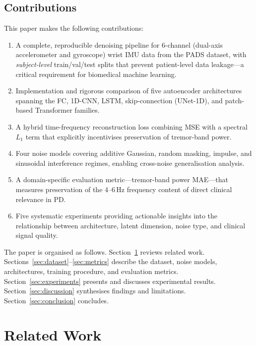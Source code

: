 \documentclass{article}
\begin{document}
\subsection{Contributions}

This paper makes the following contributions:

\begin{enumerate}
  \item A complete, reproducible denoising pipeline for 6-channel (dual-axis
    accelerometer and gyroscope) wrist IMU data from the PADS dataset, with
    \emph{subject-level} train/val/test splits that prevent patient-level
    data leakage---a critical requirement for biomedical machine learning.
  \item Implementation and rigorous comparison of five autoencoder architectures
    spanning the FC, 1D-CNN, LSTM, skip-connection (UNet-1D), and
    patch-based Transformer families.
  \item A hybrid time-frequency reconstruction loss combining MSE with a
    spectral $L_1$ term that explicitly incentivises preservation of
    tremor-band power.
  \item Four noise models covering additive Gaussian, random masking, impulse,
    and sinusoidal interference regimes, enabling cross-noise generalisation
    analysis.
  \item A domain-specific evaluation metric---tremor-band power MAE---that
    measures preservation of the 4--6\,Hz frequency content of direct
    clinical relevance in PD.
  \item Five systematic experiments providing actionable insights into the
    relationship between architecture, latent dimension, noise type, and
    clinical signal quality.
\end{enumerate}

The paper is organised as follows.
Section~\ref{sec:related} reviews related work.
Sections~\ref{sec:dataset}--\ref{sec:metrics} describe the dataset,
noise models, architectures, training procedure, and evaluation metrics.
Section~\ref{sec:experiments} presents and discusses experimental results.
Section~\ref{sec:discussion} synthesises findings and limitations.
Section~\ref{sec:conclusion} concludes.

\section{Related Work}
\label{sec:related}
\end{document}
